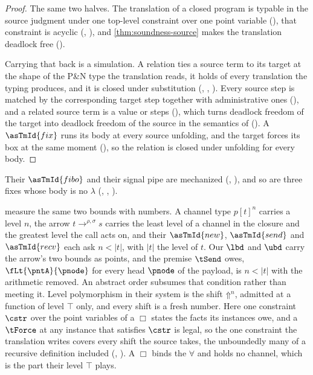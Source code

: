\begin{proof}
  The same two halves. The translation of a closed program is typable in
  the source judgment under one top-level constraint over one point
  variable (), that constraint is acyclic
  (, ), and
  \cref{thm:soundness-source} makes the translation deadlock free
  ().

  Carrying that back is a simulation. A relation ties a source term to
  its target at the shape of the P\&N type the translation reads, it
  holds of every translation the typing produces, and it is closed under
  substitution (, ,
  ). Every source step is matched by the corresponding
  target step together with administrative ones (), and a
  related source term is a value or steps (), which
  turns deadlock freedom of the target into deadlock freedom of the
  source in the semantics of \citet{PadovaniN15}
  (). A $\asTmId{fix}$ runs its body at every
  source unfolding, and the target forces its box at the same moment
  (), so the relation is closed under unfolding for every
  body.
\end{proof}

Their $\asTmId{fibo}$ and their signal pipe are mechanized
(, ), and so
are three fixes whose body is no $\lambda$
(, ,
).

 measure the same two bounds with numbers. A channel
type $p[t]^n$ carries a level $n$, the arrow $t \to^{\rho,\sigma} s$
carries the least level of a channel in the closure and the greatest
level the call acts on, and their $\asTmId{new}$, $\asTmId{send}$ and
$\asTmId{recv}$ each ask $n < \lvert t \rvert$, with
$\lvert t \rvert$ the level of $t$. Our $\lbd$ and $\ubd$ carry the
arrow's two bounds as points, and the premise $\tSend$ owes,
$\fLt{\pntA}{\pnode}$ for every head $\pnode$ of the payload, is
$n < \lvert t \rvert$ with the arithmetic removed. An abstract order
subsumes that condition rather than meeting it. Level polymorphism in
their system is the shift $\mathord{\Uparrow}^n$, admitted at a function
of level $\top$ only, and every shift is a fresh number. Here one
constraint $\cstr$ over the point variables of a $\Box$ states the facts
its instances owe, and a $\tForce$ at any instance that satisfies
$\cstr$ is legal, so the one constraint the translation writes covers
every shift the source takes, the unboundedly many of a recursive
definition included (, ). A $\Box$ binds the
$\forall$ and holds no channel, which is the part their level $\top$
plays.


